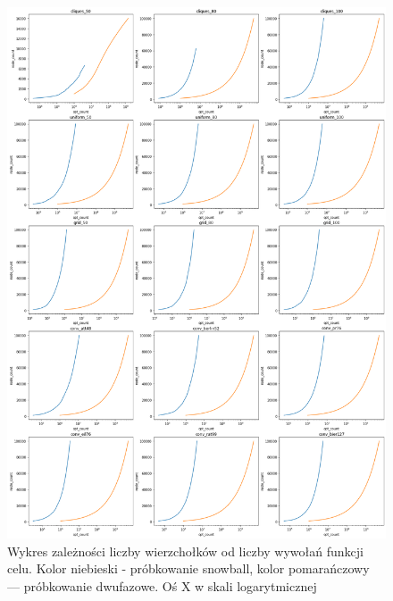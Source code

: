 \begin{figure}[h!]
    \centering
    \includegraphics[width=\textwidth]{chapters/experiments/img/opt_nodes.png}
    \caption{Wykres zależności liczby wierzchołków od liczby wywołań funkcji celu.
        Kolor niebieski - próbkowanie snowball, kolor pomarańczowy --- próbkowanie dwufazowe.
        Oś X w skali logarytmicznej}
    \label{fig:main_opt_nodes}
\end{figure}

